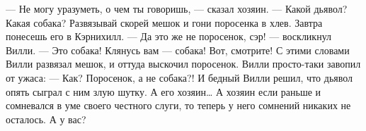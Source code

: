 — Не могу уразуметь, о чем ты говоришь, — сказал хозяин. — Какой дьявол? Какая собака? Развязывай скорей мешок и гони поросенка в хлев. Завтра понесешь его в Кэрнихилл.
— Да это же не поросенок, сэр! — воскликнул Вилли. — Это собака! Клянусь вам — собака! Вот, смотрите!
С этими словами Вилли развязал мешок, и оттуда выскочил поросенок. Вилли просто-таки завопил от ужаса:
— Как? Поросенок, а не собака?!
И бедный Вилли решил, что дьявол опять сыграл с ним злую шутку. А его хозяин…
А хозяин если раньше и сомневался в уме своего честного слуги, то теперь у него сомнений никаких не осталось.
А у вас?



